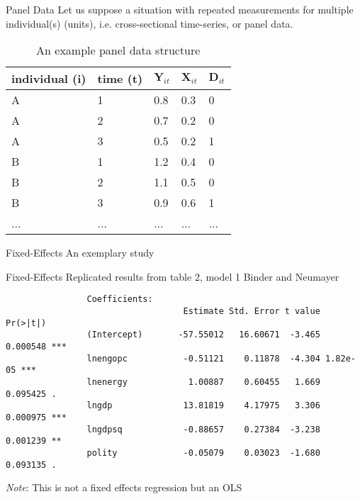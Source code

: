 \documentclass[aspectratio=169]{beamer}
\begin{document}
		\begin{frame}{Panel Data}
			Let us suppose a situation with repeated measurements for multiple individual(s) (units), i.e. cross-sectional time-series, or panel data.

			\begin{table}
				\caption{An example panel data structure}
				\footnotesize
				\begin{tabular}{|p{1.8cm}|p{1.6cm}|p{1.6cm}|p{1.6cm}||p{1.6cm}|}
					\hline
					\textbf{individual (i)} & \textbf{time (t)} & $\textbf{Y}_{it}$ & $\textbf{X}_{it}$ & $\textbf{D}_{it}$ \\
					\hline
					A & 1 & 0.8 & 0.3 & 0 \\
					A & 2 & 0.7 & 0.2 & 0 \\
					A & 3 & 0.5 & 0.2 & 1 \\
					\hline
					B & 1 & 1.2 & 0.4 & 0 \\
					B & 2 & 1.1 & 0.5 & 0 \\
					B & 3 & 0.9 & 0.6 & 1 \\
					\hline
					{...} & {...} & {...} & {...} & {...} \\
					\hline
				\end{tabular}
			\end{table}
		\end{frame}

		\begin{frame}{Fixed-Effects}
			An exemplary study
			\begin{center}
			\end{center}
		\end{frame}

		\begin{frame}[fragile]{Fixed-Effects}
			Replicated results from table 2, model 1 Binder and Neumayer \citeyear{Binder2005}
			\begin{verbatim}
				Coefficients:
				                   Estimate Std. Error t value Pr(>|t|)
				(Intercept)       -57.55012   16.60671  -3.465 0.000548 ***
				lnengopc           -0.51121    0.11878  -4.304 1.82e-05 ***
				lnenergy            1.00887    0.60455   1.669 0.095425 .
				lngdp              13.81819    4.17975   3.306 0.000975 ***
				lngdpsq            -0.88657    0.27384  -3.238 0.001239 **
				polity             -0.05079    0.03023  -1.680 0.093135 .
			\end{verbatim}
			\footnotesize \textit{Note}: This is not a fixed effects regression but an OLS
		\end{frame}
\end{document}
